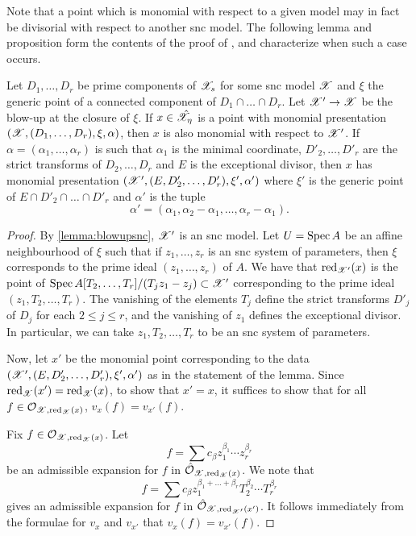Note that a point which is monomial with respect to a given model may in fact be divisorial with respect to another snc model. 
The following lemma and proposition form the contents of the proof of \parencite[Prop. 2.4.11]{MN}, and characterize when such a case occurs.

\begin{lemma} \label{blowupintersection}
    Let $D_1, \dots, D_r$ be prime components of $\mathscr{X}_s$ for some snc model $\mathscr{X}$ and $\xi$ the generic point of a connected component of $D_1 \cap \dots \cap D_r$. 
    Let $\mathscr{X}' \to \mathscr{X}$ be the blow-up at the closure of $\xi$.
    If $x \in \hat{\mathscr{X}}_{\eta}$ is a point with monomial presentation $(\mathscr{X}, (D_1, \dots, D_r), \xi, \alpha)$, then $x$ is also monomial with respect to $\mathscr{X}'$.
    If $\alpha = (\alpha_1, \dots, \alpha_r)$ is such that $\alpha_1$ is the minimal coordinate, $D'_2, \dots, D'_r$ are the strict transforms of $D_2, \dots, D_r$ and $E$ is the exceptional divisor, then $x$ has monomial presentation $(\mathscr{X}', (E, D'_2, \dots, D'_r), \xi', \alpha')$ where $\xi'$ is the generic point of $E \cap D'_2 \cap \dots \cap D'_r$  and $\alpha'$ is the tuple
    \[
        \alpha' = (\alpha_1, \alpha_2 - \alpha_1, \dots, \alpha_r - \alpha_1).
    \]
\end{lemma}
\begin{proof}
    By \cref{lemma:blowupsnc}, $\mathscr{X}'$ is an snc model.
    Let $U = \operatorname{Spec} A$ be an affine neighbourhood of $\xi$ such that if $z_1, \dots, z_r$ is an snc system of parameters, then $\xi$ corresponds to the prime ideal $(z_1, \dots, z_r)$ of $A$.
    We have that $\operatorname{red}_{\mathscr{X}'}(x)$ is the point of $\operatorname{Spec} A[T_2, \dots, T_r]/(T_jz_1 - z_j) \subset \mathscr{X}'$ corresponding to the prime ideal $(z_1, T_2, \dots, T_r)$.
    The vanishing of the elements $T_j$ define the strict transforms $D'_j$ of $D_j$ for each $2 \leq j \leq r$, and the vanishing of $z_1$ defines the exceptional divisor.
    In particular, we can take $z_1, T_2, \dots, T_r$ to be an snc system of parameters.
    
    Now, let $x'$ be the monomial point corresponding to the data $(\mathscr{X}', (E, D'_2, \dots, D'_r), \xi', \alpha')$ as in the statement of the lemma.
    Since $\operatorname{red}_{\mathscr{X}}(x') = \operatorname{red}_{\mathscr{X}}(x)$, to show that $x' = x$, it suffices to show that for all $f \in \mathcal{O}_{\mathscr{X}, \operatorname{red}_{\mathscr{X}}(x)}$, $v_x(f) = v_{x'}(f)$.
    
    Fix $f \in \mathcal{O}_{\mathscr{X}, \operatorname{red}_{\mathscr{X}}(x)}$.
    Let
    \[
        f = \sum c_{\beta} z_1^{\beta_1} \cdots z_r^{\beta_r}
    \]
    be an admissible expansion for $f$ in $\hat{\mathcal{O}}_{\mathscr{X}, \operatorname{red}_{\mathscr{X}}(x)}$.
    We note that 
    \[
        f = \sum c_{\beta} z_1^{\beta_1 + \dots + \beta_r} T_2^{\beta_2} \cdots T_r^{\beta_r}
    \]
    gives an admissible expansion for $f$ in $\hat{\mathcal{O}}_{\mathscr{X}, \operatorname{red}_{\mathscr{X}'}(x')}$.
    It follows immediately from the formulae for $v_x$ and $v_{x'}$ that $v_x(f) = v_{x'}(f)$.
 \end{proof}


